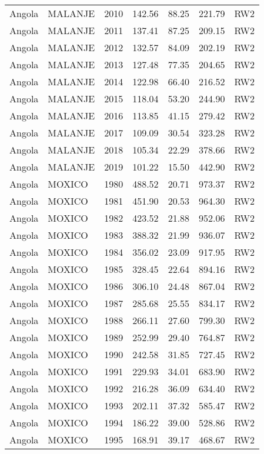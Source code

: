 \begin{longtable}{lllrrrl}
  Angola & MALANJE & 2010 & 142.56 & 88.25 & 221.79 & RW2 \\ 
  Angola & MALANJE & 2011 & 137.41 & 87.25 & 209.15 & RW2 \\ 
  Angola & MALANJE & 2012 & 132.57 & 84.09 & 202.19 & RW2 \\ 
  Angola & MALANJE & 2013 & 127.48 & 77.35 & 204.65 & RW2 \\ 
  Angola & MALANJE & 2014 & 122.98 & 66.40 & 216.52 & RW2 \\ 
  Angola & MALANJE & 2015 & 118.04 & 53.20 & 244.90 & RW2 \\ 
  Angola & MALANJE & 2016 & 113.85 & 41.15 & 279.42 & RW2 \\ 
  Angola & MALANJE & 2017 & 109.09 & 30.54 & 323.28 & RW2 \\ 
  Angola & MALANJE & 2018 & 105.34 & 22.29 & 378.66 & RW2 \\ 
  Angola & MALANJE & 2019 & 101.22 & 15.50 & 442.90 & RW2 \\ 
  Angola & MOXICO & 1980 & 488.52 & 20.71 & 973.37 & RW2 \\ 
  Angola & MOXICO & 1981 & 451.90 & 20.53 & 964.30 & RW2 \\ 
  Angola & MOXICO & 1982 & 423.52 & 21.88 & 952.06 & RW2 \\ 
  Angola & MOXICO & 1983 & 388.32 & 21.99 & 936.07 & RW2 \\ 
  Angola & MOXICO & 1984 & 356.02 & 23.09 & 917.95 & RW2 \\ 
  Angola & MOXICO & 1985 & 328.45 & 22.64 & 894.16 & RW2 \\ 
  Angola & MOXICO & 1986 & 306.10 & 24.48 & 867.04 & RW2 \\ 
  Angola & MOXICO & 1987 & 285.68 & 25.55 & 834.17 & RW2 \\ 
  Angola & MOXICO & 1988 & 266.11 & 27.60 & 799.30 & RW2 \\ 
  Angola & MOXICO & 1989 & 252.99 & 29.40 & 764.87 & RW2 \\ 
  Angola & MOXICO & 1990 & 242.58 & 31.85 & 727.45 & RW2 \\ 
  Angola & MOXICO & 1991 & 229.93 & 34.01 & 683.90 & RW2 \\ 
  Angola & MOXICO & 1992 & 216.28 & 36.09 & 634.40 & RW2 \\ 
  Angola & MOXICO & 1993 & 202.11 & 37.32 & 585.47 & RW2 \\ 
  Angola & MOXICO & 1994 & 186.22 & 39.00 & 528.86 & RW2 \\ 
  Angola & MOXICO & 1995 & 168.91 & 39.17 & 468.67 & RW2 \\ 

\end{longtable}
